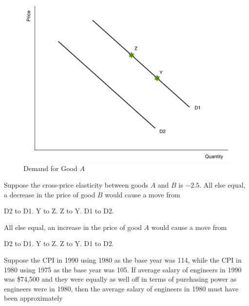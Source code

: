 \documentclass[addpoints,11pt]{exam}
\theoremstyle{definition}
\begin{document}
\begin{questions}

\begin{figure}[H]
	\centering
	\includegraphics[scale=.38]{Exam1_MC2.pdf}
	\caption{Demand for Good $A$}
	\label{MC1}
\end{figure}

\question \label{q4} Suppose the cross-price elasticity between goods $A$ and $B$ is $-2.5$. All else equal, a decrease in the price of good $B$ would cause a move from  

\begin{choices}
	\CorrectChoice D2 to D1.
	\choice Y to Z.
	\choice Z to Y.
	\choice D1 to D2.
\end{choices}


\question \label{q5} All else equal, an increase in the price of good $A$ would cause a move from

\begin{choices}
	\choice D2 to D1.
	\CorrectChoice Y to Z.
	\choice Z to Y.
	\choice D1 to D2.
\end{choices}

\newpage

\question Suppose the CPI in 1990 using 1980 as the base year was 114, while the CPI in 1980 using 1975 as the base year was 105. If average salary of engineers in 1990 was \$74,500 and they were equally as well off in terms of purchasing power as engineers were in 1980, then the average salary of engineers in 1980 must have been approximately


\end{questions}
\end{document}
